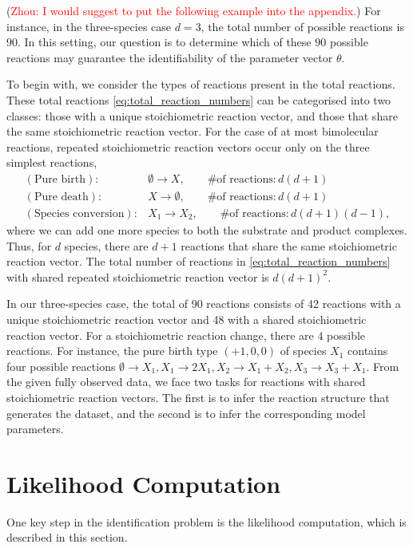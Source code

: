 \documentclass[pdflatex,sn-mathphys-num]{sn-jnl}%
\theoremstyle{thmstyleone}%
\theoremstyle{thmstyletwo}%
\theoremstyle{thmstylethree}%
\begin{document}
(\textcolor{red}{Zhou: I would suggest to put the following example into the appendix.})
For instance, in the three-species case $d = 3$, the total number of possible reactions is $90$.
In this setting, our question is to determine which of these $90$ possible reactions may guarantee the identifiability of the parameter vector $\theta$.

To begin with, we consider the types of reactions present in the total reactions.
These total reactions \eqref{eq:total_reaction_numbers} can be categorised into two classes: those with a unique stoichiometric reaction vector, and those that share the same stoichiometric reaction vector. For the case of at most bimolecular reactions, repeated stoichiometric reaction vectors occur only on the three simplest reactions,
\begin{align*}
 (\text{Pure birth}): &\emptyset \rightarrow X, \quad\quad \text{\# of reactions}:d(d+1)\\
 (\text{Pure death}): &X \rightarrow \emptyset, \quad\quad \text{\# of reactions}:d(d+1) \\
(\text{Species conversion}): &X_1 \rightarrow X_2, \quad\quad \text{\# of reactions}:d(d+1)(d-1),
\end{align*}
where we can add one more species to both the substrate and product complexes. Thus, for $d$ species, there are $d+1$ reactions that share the same stoichiometric reaction vector. The total number of reactions in \eqref{eq:total_reaction_numbers} with shared repeated stoichiometric reaction vector is $d(d+1)^2$. 

In our three-species case, the total of 90 reactions consists of 42 reactions with a unique stoichiometric reaction vector and 48 with a shared stoichiometric reaction vector. For a stoichiometric reaction change, there are $4$ possible reactions. For instance, the pure birth type $(+1,0,0)$ of species $X_1$ contains four possible reactions $\emptyset \rightarrow X_1,X_1 \rightarrow 2X_1, X_2 \rightarrow X_1+X_2,X_3 \rightarrow X_3+X_1 $. From the given fully observed data, we face two tasks for reactions with shared stoichiometric reaction vectors. The first is to infer the reaction structure that generates the dataset, and the second is to infer the corresponding model parameters.


\section{Likelihood Computation}


One key step in the identification problem is the likelihood computation, which is described in this section.
\end{document}
